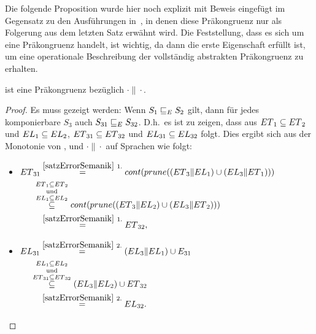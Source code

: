Die folgende Proposition wurde hier noch explizit mit Beweis eingefügt im
Gegensatz zu den Ausführungen in~\cite{Vogler2014EIO}, in denen diese
Präkongruenz nur als Folgerung aus dem letzten Satz erwähnt wird. Die
Feststellung, dass es sich um eine Präkongruenz handelt, ist wichtig, da
dann die erste Eigenschaft erfüllt ist, um eine operationale Beschreibung der
vollständig abstrakten Präkongruenz \ECRel{} zu erhalten.

\begin{prop}
\label{propPraekongruenz}
  \ERel{} ist eine Präkongruenz bezüglich $\cdot\|\cdot$.
\end{prop}

\begin{proof}
  Es muss gezeigt werden: Wenn $S_1\sqsubseteq _E S_2$ gilt, dann für jedes
  komponierbare $S_3$ auch $S_{31}\sqsubseteq _E S_{32}$. D.h.\ es ist zu zeigen,
  dass aus $ET{}_1\subseteq ET{}_2$ und $EL{}_1\subseteq EL{}_2$,
  $ET{}_{31}\subseteq ET{}_{32}$ und $EL{}_{31}\subseteq
  EL{}_{32}$ folgt. Dies ergibt sich aus der Monotonie von \cont{},
  \prune{} und $\cdot \|\cdot$ auf Sprachen wie folgt:\\
  \begin{itemize}
    \item $\begin{aligned}[t]
        \ET{}_{31} &\overset{\ref{satzErrorSemanik}~1.}{=}
      \cont{}(\prune{}((\ET{}_3\|\EL{}_1)\cup (\EL{}_3\|\ET{}_1)))\\
      &\hspace{-0.3cm}\overset{\ET{}_1\subseteq
    \ET{}_2}{\overset{\mathrm{und}}{\overset{\EL{}_1\subseteq \EL{}_2}{\subseteq}}}
    \cont{}(\prune{}((\ET{}_3\|\EL{}_2)\cup (\EL{}_3\|\ET{}_2)))\\
    &\overset{\ref{satzErrorSemanik}~1.}{=} \ET{}_{32},
    \end{aligned}$
    \item $\begin{aligned}[t]
        \EL{}_{31} &\overset{\ref{satzErrorSemanik}~2.}{=} (\EL{}_3\|\EL{}_1)\cup
        E_{31}\\
        &\hspace{-0.4cm}\overset{\EL{}_1\subseteq
      \EL{}_2}{\overset{\mathrm{und}}{\overset{\ET{}_{31}\subseteq
      \ET{}_{32}}{\subseteq}}} (\EL{}_3\|\EL{}_2)\cup \ET{}_{32}\\
      &\overset{\ref{satzErrorSemanik}~2.}{=} \EL{}_{32}.
    \end{aligned}$
  \end{itemize}
\end{proof}

